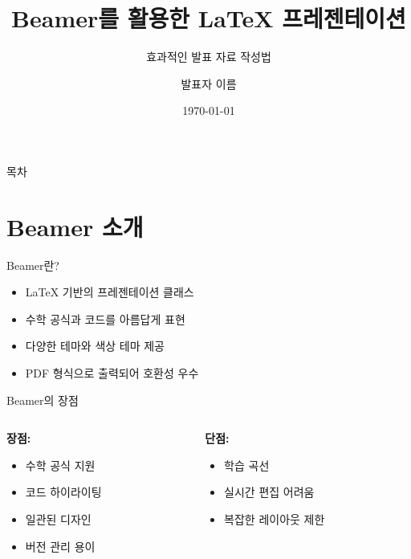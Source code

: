 \documentclass[aspectratio=169]{beamer}
\title{Beamer를 활용한 LaTeX 프레젠테이션}
\subtitle{효과적인 발표 자료 작성법}
\author{발표자 이름}
\institute{소속 기관}
\date{\today}
\begin{document}
\begin{frame}
    \titlepage
\end{frame}

\begin{frame}{목차}
    \tableofcontents
\end{frame}

\section{Beamer 소개}

\begin{frame}{Beamer란?}
    \begin{itemize}
        \item<1-> LaTeX 기반의 프레젠테이션 클래스
        \item<2-> 수학 공식과 코드를 아름답게 표현
        \item<3-> 다양한 테마와 색상 테마 제공
        \item<4-> PDF 형식으로 출력되어 호환성 우수
    \end{itemize}
\end{frame}

\begin{frame}{Beamer의 장점}
    \begin{columns}
        \begin{column}{0.5\textwidth}
            \textbf{장점:}
            \begin{itemize}
                \item 수학 공식 지원
                \item 코드 하이라이팅
                \item 일관된 디자인
                \item 버전 관리 용이
            \end{itemize}
        \end{column}
        \begin{column}{0.5\textwidth}
            \textbf{단점:}
            \begin{itemize}
                \item 학습 곡선
                \item 실시간 편집 어려움
                \item 복잡한 레이아웃 제한
            \end{itemize}
        \end{column}
    \end{columns}
\end{frame}
\end{document}
